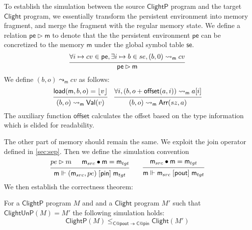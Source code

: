 \documentclass[acmsmall,screen,review,anonymous]{acmart}
\newcommand{\kw}[1]{\ensuremath{ \mathsf{#1} }}
\newcommand{\ifr}[1]{\mathrel{[{#1}]}}
\newcommand{\ClightP}{\ensuremath{ \mathsf{ClightP} }}
\newcommand{\Clight}{\ensuremath{ \mathsf{Clight} }}
\begin{document}
To establish the simulation between
the source $\ClightP$ program and the target $\Clight$ program,
we essentially transform the persistent environment into memory fragment,
and merge the fragment with the regular memory state.
We define a relation $\kw{pe} \rhd \kw{m}$
to denote that the the persistent environment $\kw{pe}$
can be concretized to the memory $\kw{m}$ under the global symbol table $\kw{se}$.
\[
  \begin{prooftree}
    \hypo{\forall i \mapsto cv \in \kw{pe}, \exists i \mapsto b \in se,
      (b,0) \leadsto_{\kw{m}} cv}
    \infer1{\kw{pe} \rhd \kw{m}}
  \end{prooftree}
\]
We define $(b, o) \leadsto_{\kw{m}} cv$ as follows:
\begin{gather*}
  {
  \begin{prooftree}
    \hypo{\kw{load}(\kw{m}, b, o) = \lfloor v \rfloor }
    \infer1{(b, o) \leadsto_{\kw{m}} \kw{Val}(v)}
  \end{prooftree}
  }
  \quad
  {
  \begin{prooftree}
    \hypo{\forall i, (b, o+\kw{offset}(a, i)) \leadsto_{\kw{m}} a[i]}
    \infer1{(b, o) \leadsto_{\kw{m}} \kw{Arr}(sz, a)}
  \end{prooftree}
  }
\end{gather*}
The auxiliary function $\kw{offset}$
calculates the offset based on the type information
which is elided for readability.

The other part of memory should remain the same.
We exploit the join operator defined in \ref{sec:sep}.
Then we define the simulation convention
\[
  \begin{prooftree}
    \hypo{pe \rhd m}
    \hypo{\kw{m}_{src} \bullet \kw{m} = \kw{m}_{tgt}}
    \infer2{\kw{m} \Vdash (\kw{m}_{src}, pe) \ifr{\kw{pin}} \kw{m}_{tgt}}
  \end{prooftree}
  \qquad
  \begin{prooftree}
    \hypo{\kw{m}_{src} \bullet \kw{m} = \kw{m}_{tgt}}
    \infer1{\kw{m} \Vdash \kw{m}_{src} \ifr{\kw{pout}} \kw{m}_{tgt}}
  \end{prooftree}
\]
We then establish the correctness theorem:
\begin{theorem}[Correctness of $\kw{ClightUnP}$]
  For a $\ClightP$ program $M$ and and a $\Clight$ program $M'$
  such that
  $\kw{ClightUnP}(M) = M'$
  the following simulation holds:
  \[
    \ClightP(M) \le_{\mathsf{C}@\kw{pout} \twoheadrightarrow \mathsf{C}@\kw{pin}} \Clight(M')
  \]
\end{theorem}
\end{document}
